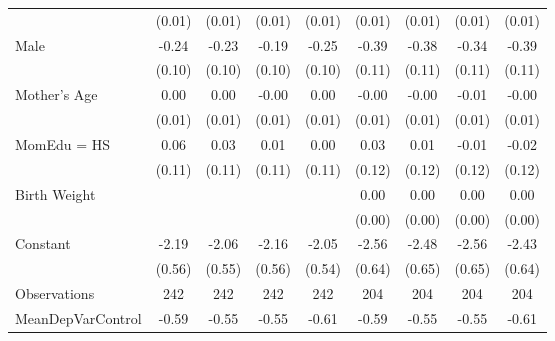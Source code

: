 {\begin{tabular}{l*{8}{c}}
                    &      (0.01)         &      (0.01)         &      (0.01)         &      (0.01)         &      (0.01)         &      (0.01)         &      (0.01)         &      (0.01)         \\
[1em]
Male                &       -0.24\sym{**} &       -0.23\sym{**} &       -0.19\sym{*}  &       -0.25\sym{**} &       -0.39\sym{***}&       -0.38\sym{***}&       -0.34\sym{***}&       -0.39\sym{***}\\
                    &      (0.10)         &      (0.10)         &      (0.10)         &      (0.10)         &      (0.11)         &      (0.11)         &      (0.11)         &      (0.11)         \\
[1em]
Mother's Age        &        0.00         &        0.00         &       -0.00         &        0.00         &       -0.00         &       -0.00         &       -0.01         &       -0.00         \\
                    &      (0.01)         &      (0.01)         &      (0.01)         &      (0.01)         &      (0.01)         &      (0.01)         &      (0.01)         &      (0.01)         \\
[1em]
MomEdu = HS         &        0.06         &        0.03         &        0.01         &        0.00         &        0.03         &        0.01         &       -0.01         &       -0.02         \\
                    &      (0.11)         &      (0.11)         &      (0.11)         &      (0.11)         &      (0.12)         &      (0.12)         &      (0.12)         &      (0.12)         \\
[1em]
Birth Weight        &                     &                     &                     &                     &        0.00\sym{**} &        0.00\sym{**} &        0.00\sym{**} &        0.00\sym{**} \\
                    &                     &                     &                     &                     &      (0.00)         &      (0.00)         &      (0.00)         &      (0.00)         \\
[1em]
Constant            &       -2.19\sym{***}&       -2.06\sym{***}&       -2.16\sym{***}&       -2.05\sym{***}&       -2.56\sym{***}&       -2.48\sym{***}&       -2.56\sym{***}&       -2.43\sym{***}\\
                    &      (0.56)         &      (0.55)         &      (0.56)         &      (0.54)         &      (0.64)         &      (0.65)         &      (0.65)         &      (0.64)         \\
\hline
Observations        &         242         &         242         &         242         &         242         &         204         &         204         &         204         &         204         \\
MeanDepVarControl   &       -0.59         &       -0.55         &       -0.55         &       -0.61         &       -0.59         &       -0.55         &       -0.55         &       -0.61         \\
\hline\hline
\end{tabular}
}
